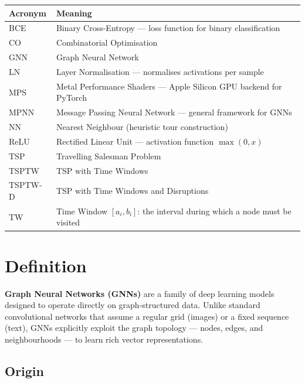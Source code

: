 \documentclass[12pt,a4paper]{article}
\begin{document}
\begin{center}
\begin{tabularx}{\linewidth}{lX}
\toprule
\textbf{Acronym} & \textbf{Meaning} \\
\midrule
BCE     & Binary Cross-Entropy --- loss function for binary classification \\
CO      & Combinatorial Optimisation \\
GNN     & Graph Neural Network \\
LN      & Layer Normalisation --- normalises activations per sample \\
MPS     & Metal Performance Shaders --- Apple Silicon GPU backend for PyTorch \\
MPNN    & Message Passing Neural Network --- general framework for GNNs \\
NN      & Nearest Neighbour (heuristic tour construction) \\
ReLU    & Rectified Linear Unit --- activation function $\max(0,x)$ \\
TSP     & Travelling Salesman Problem \\
TSPTW   & TSP with Time Windows \\
TSPTW-D & TSP with Time Windows and Disruptions \\
TW      & Time Window $[a_i, b_i]$: the interval during which a node must be visited \\
\bottomrule
\end{tabularx}
\end{center}

\newpage

\section{Definition}

\textbf{Graph Neural Networks (GNNs)} are a family of deep learning models
designed to operate directly on graph-structured data.
Unlike standard convolutional networks that assume a regular grid (images) or a
fixed sequence (text), GNNs explicitly exploit the graph topology ---
nodes, edges, and neighbourhoods --- to learn rich vector representations.

\subsection*{Origin}
\end{document}
